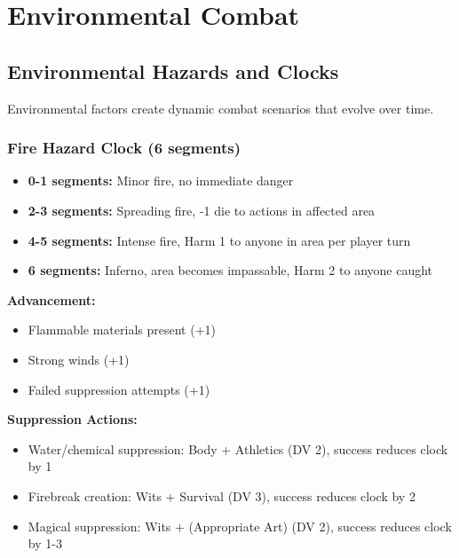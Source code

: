 \newpage

\section{Environmental Combat}

\subsection{Environmental Hazards and Clocks}

Environmental factors create dynamic combat scenarios that evolve over time.

\subsubsection{Fire Hazard Clock (6 segments)}
\begin{itemize}[leftmargin=*]
    \item \textbf{0-1 segments:} Minor fire, no immediate danger
    \item \textbf{2-3 segments:} Spreading fire, -1 die to actions in affected area
    \item \textbf{4-5 segments:} Intense fire, Harm 1 to anyone in area per player turn
    \item \textbf{6 segments:} Inferno, area becomes impassable, Harm 2 to anyone caught
\end{itemize}

\textbf{Advancement:}
\begin{itemize}[leftmargin=*]
    \item Flammable materials present (+1)
    \item Strong winds (+1)
    \item Failed suppression attempts (+1)
\end{itemize}

\textbf{Suppression Actions:}
\begin{itemize}[leftmargin=*]
    \item Water/chemical suppression: Body + Athletics (DV 2), success reduces clock by 1
    \item Firebreak creation: Wits + Survival (DV 3), success reduces clock by 2
    \item Magical suppression: Wits + (Appropriate Art) (DV 2), success reduces clock by 1-3
\end{itemize}

